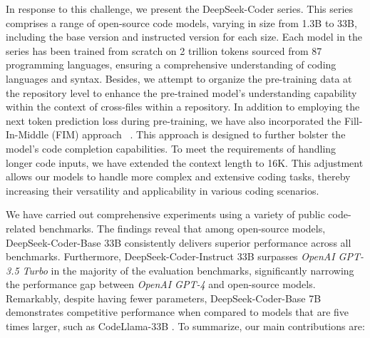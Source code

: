 In response to this challenge, we present the DeepSeek-Coder series. This series comprises a range of open-source code models, varying in size from 1.3B to 33B, including the base version and instructed version for each size. Each model in the series has been trained from scratch on  2 trillion tokens sourced from 87 programming languages, ensuring a comprehensive understanding of coding languages and syntax. Besides, we attempt to organize the pre-training data at the repository level to enhance the pre-trained model's understanding capability within the context of cross-files within a repository. In addition to employing the next token prediction loss during pre-training, we have also incorporated the Fill-In-Middle (FIM) approach ~\citep{li2023starcoder,bavarian2022efficient}. This approach is designed to further bolster the model's code completion capabilities. To meet the requirements of handling longer code inputs, we have extended the context length to 16K. This adjustment allows our models to handle more complex and extensive coding tasks, thereby increasing their versatility and applicability in various coding scenarios.

We have carried out comprehensive experiments using a variety of public code-related benchmarks. The findings reveal that among open-source models, DeepSeek-Coder-Base 33B consistently delivers superior performance across all benchmarks. Furthermore, DeepSeek-Coder-Instruct 33B surpasses  \textit{OpenAI GPT-3.5 Turbo}  in the majority of the evaluation benchmarks, significantly narrowing the performance gap between \textit{OpenAI GPT-4}  and open-source models. Remarkably, despite having fewer parameters, DeepSeek-Coder-Base 7B demonstrates competitive performance when compared to models that are five times larger, such as CodeLlama-33B \citep{roziere2023code}. To summarize, our main contributions are:

